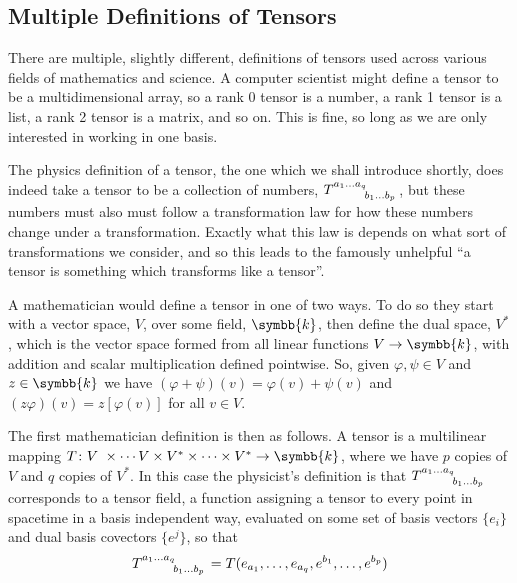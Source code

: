 \documentclass[fleqn]{NotesClass}
\renewcommand{\field}{\symbb{k}}
\renewcommand{\ve}[1]{e_{#1}}
\newcommand{\dualve}[1]{e^{#1}}
\begin{document}
\begin{appendices}
        \section{Multiple Definitions of Tensors}\label{sec:technicalities tensor defs}
        There are multiple, slightly different, definitions of tensors used across various fields of mathematics and science.
        A computer scientist might define a tensor to be a multidimensional array, so a rank 0 tensor is a number, a rank 1 tensor is a list, a rank 2 tensor is a matrix, and so on.
        This is fine, so long as we are only interested in working in one basis.
        
        The physics definition of a tensor, the one which we shall introduce shortly, does indeed take a tensor to be a collection of numbers, \(\tensor{T}{^{a_1\dotso a_q}_{b_1\dotso b_p}}\), but these numbers must also must follow a transformation law for how these numbers change under a transformation.
        Exactly what this law is depends on what sort of transformations we consider, and so this leads to the famously unhelpful \enquote{a tensor is something which transforms like a tensor}.
        
        A mathematician would define a tensor in one of two ways.
        To do so they start with a vector space, \(V\), over some field, \(\field\), then define the dual space, \(V^*\), which is the vector space formed from all linear functions \(V \to \field\), with addition and scalar multiplication defined pointwise.
        So, given \(\varphi, \psi \in V\) and \(z \in \field\) we have \((\varphi + \psi)(v) = \varphi(v) + \psi(v)\) and \((z\varphi)(v) = z[\varphi(v)]\) for all \(v \in V\).
        
        The first mathematician definition is then as follows.
        A tensor is a multilinear mapping \(T \colon V\ \times \dotsm V \times V^* \times \dotsb \times V^* \to \field\), where we have \(p\) copies of \(V\) and \(q\) copies of \(V^*\).
        In this case the physicist's definition is that \(\tensor{T}{^{a_1 \dotso a_q}_{b_1 \dotso b_p}}\) corresponds to a tensor field, a function assigning a tensor to every point in spacetime in a basis independent way, evaluated on some set of basis vectors \(\{\ve{i}\}\) and dual basis covectors \(\{\dualve{j}\}\), so that
        \begin{equation}
            \tensor{T}{^{a_1 \dotso a_q}_{b_1 \dotso b_p}} = T(\ve{a_1}, \dotsc, \ve{a_q}, \dualve{b_1}, \dotsc, \dualve{b_p})
        \end{equation}
        

\end{appendices}
\end{document}
